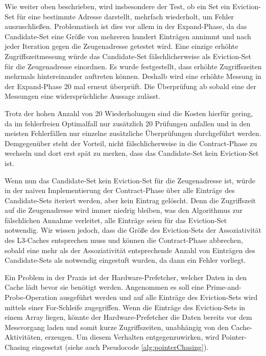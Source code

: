 Wie weiter oben beschrieben, wird insbesondere der Test, ob ein Set ein Eviction-Set für eine bestimmte Adresse darstellt, mehrfach wiederholt, um Fehler auszuschließen. 
Problematisch ist dies vor allem in der Expand-Phase, da das Candidate-Set eine Größe von mehreren hundert Einträgen annimmt und nach jeder Iteration gegen die Zeugenadresse getestet wird. 
Eine einzige erhöhte Zugriffszeitmessung würde das Candidate-Set fälschlicherweise als Eviction-Set für die Zeugenadresse einordnen. 
Es wurde festgestellt, dass erhöhte Zugriffszeiten mehrmals hintereinander auftreten können. Deshalb wird eine erhöhte Messung in der Expand-Phase 20 mal erneut überprüft. 
Die Überprüfung ab sobald eine der Messungen eine widersprüchliche Aussage zulässt.

Trotz der hohen Anzahl von 20 Wiederholungen sind die Kosten hierfür gering, da im fehlerfreien Optimalfall nur zusätzlich 20 Prüfungen anfallen und in den meisten Fehlerfällen nur einzelne zusätzliche Überprüfungen durchgeführt werden. 
Demgegenüber steht der Vorteil, nicht fälschlicherweise in die Contract-Phase zu wechseln und dort erst spät zu merken, dass das Candidate-Set kein Eviction-Set ist.

Wenn nun das Candidate-Set kein Eviction-Set für die Zeugenadresse ist, würde in der naiven Implementierung der Contract-Phase über alle Einträge des Candidate-Sets iteriert werden, aber kein Eintrag gelöscht.
Denn die Zugriffszeit auf die Zeugenadresse wird immer niedrig bleiben, was den Algorithmus zur fälschlichen Annahme verleitet, alle Einträge seien für das Eviction-Set notwendig.
Wir wissen jedoch, dass die Größe des Eviction-Sets der Assoziativität des L3-Caches entsprechen muss und können die Contract-Phase abbrechen, sobald eine mehr als der Assoziativität entsprechende Anzahl von Einträgen des Candidate-Sets als notwendig eingestuft wurden, da dann ein Fehler vorliegt.

Ein Problem in der Praxis ist der Hardware-Prefetcher, welcher Daten in den Cache lädt bevor sie benötigt werden.
Angenommen es soll eine Prime-and-Probe-Operation ausgeführt werden und auf alle Einträge des Eviction-Sets wird mittels einer For-Schleife zugegriffen.
Wenn die Einträge des Eviction-Sets in einem Array liegen, könnte der Hardware-Prefetcher die Daten bereits vor dem Messvorgang laden und somit kurze Zugriffszeiten, unabhängig von den Cache-Aktivitäten, erzeugen.
Um diesem Verhalten entgegenzuwirken, wird Pointer-Chasing eingesetzt (siehe auch Pseudocode \ref{alg:pointerChasing}).

